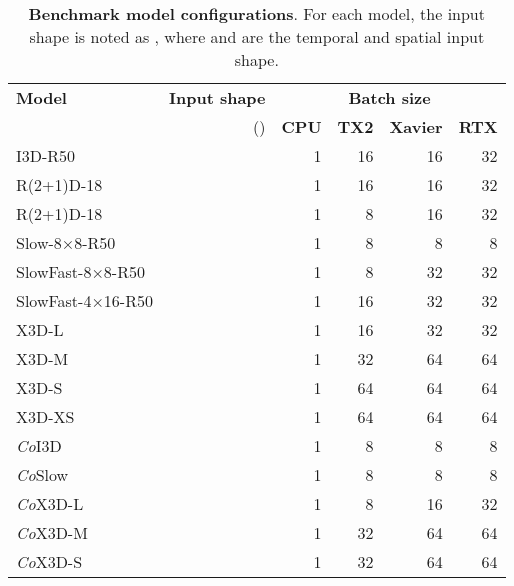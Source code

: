 \documentclass[runningheads]{llncs}
\begin{document}
\begin{table}[!htbp]
\begin{center}
\begin{tabular}{lrrrrr}
    \toprule
    \textbf{Model} &\textbf{Input shape} &\multicolumn{4}{c}{\textbf{Batch size}}
        \\ \cline{3-6}
        &() &\textbf{CPU} & \textbf{TX2}  &\textbf{Xavier} &\textbf{RTX}
    \\
    \midrule
    
    I3D-R50                       &       & 1       & 16      & 16       & 32     \\
    R(2+1)D-18                &       & 1       & 16      & 16       & 32     \\
    R(2+1)D-18             &       & 1       & 8       & 16       & 32     \\
    Slow-8×8-R50                  &       & 1       & 8       & 8        & 8     \\ 
    SlowFast-8×8-R50              &       & 1       & 8       & 32       & 32     \\ 
    SlowFast-4×16-R50             &       & 1       & 16      & 32       & 32     \\ X3D-L                         &       & 1       & 16       & 32       & 32     \\
    X3D-M                         &       & 1       & 32      & 64       & 64     \\
    X3D-S                         &       & 1       & 64      & 64       & 64     \\
    X3D-XS                        &       & 1       & 64      & 64       & 64     \\
    \textit{Co}I3D                &       & 1       & 8       & 8        & 8     \\
    \textit{Co}Slow                &       & 1       & 8       & 8        & 8     \\
    \textit{Co}X3D-L              &       & 1       & 8       & 16       & 32     \\
    \textit{Co}X3D-M              &       & 1       & 32      & 64       & 64     \\
    \textit{Co}X3D-S              &       & 1       & 32      & 64       & 64     \\
    \bottomrule
\end{tabular}
\end{center}
\caption{
    \textbf{Benchmark model configurations}. For each model, the input shape is noted as , where  and  are the temporal and spatial input shape. 
}
\label{tab:benchmark-config}
\end{table}
\end{document}
